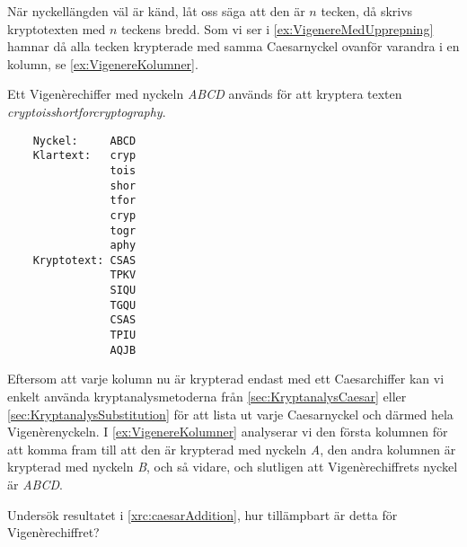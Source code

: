 När nyckellängden väl är känd, låt oss säga att den är \(n\) tecken, då skrivs 
kryptotexten med \(n\) teckens bredd.
Som vi ser i \cref{ex:VigenereMedUpprepning} hamnar då alla tecken 
krypterade med samma Caesarnyckel ovanför varandra i en kolumn, se 
\cref{ex:VigenereKolumner}.
\begin{example}\label{ex:VigenereKolumner}
  Ett Vigenèrechiffer med nyckeln \emph{ABCD} används för att kryptera texten 
  \emph{cryptoisshortforcryptography}.
  \begin{verbatim}
    Nyckel:     ABCD
    Klartext:   cryp
                tois
                shor
                tfor
                cryp
                togr
                aphy
    Kryptotext: CSAS
                TPKV
                SIQU
                TGQU
                CSAS
                TPIU
                AQJB
  \end{verbatim}
\end{example}
Eftersom att varje kolumn nu är krypterad endast med ett Caesarchiffer kan vi 
enkelt använda kryptanalysmetoderna från \cref{sec:KryptanalysCaesar}
eller \cref{sec:KryptanalysSubstitution} för att lista ut varje 
Caesarnyckel och därmed hela Vigenèrenyckeln.
I \cref{ex:VigenereKolumner} analyserar vi den första kolumnen för att 
komma fram till att den är krypterad med nyckeln \emph{A}, den andra kolumnen 
är krypterad med nyckeln \emph{B}, och så vidare, och slutligen att 
Vigenèrechiffrets nyckel är \emph{ABCD}.

\begin{exercise}
  Undersök resultatet i \cref{xrc:caesarAddition}, hur tillämpbart är 
  detta för Vigenèrechiffret?
\end{exercise}

